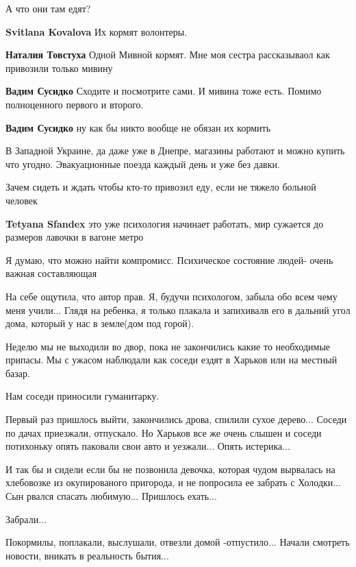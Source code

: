 \begin{itemize}
А что они там едят?

\begin{itemize} %
\textbf{Svitlana Kovalova} Их кормят волонтеры.

\textbf{Наталия Товстуха} Одной Мивной кормят. Мне моя сестра рассказываол как привозили только мивину

\textbf{Вадим Сусидко} Сходите и посмотрите сами. И мивина тоже есть. Помимо полноценного первого и второго.

\textbf{Вадим Сусидко} ну как бы никто вообще не обязан их кормить

В Западной Украине, да даже уже в Днепре, магазины работают и можно купить что
угодно. Эвакуационные поезда каждый день и уже без давки.

Зачем сидеть и ждать чтобы кто-то привозил еду, если не тяжело больной человек

\textbf{Tetyana Sfandex} это уже психология начинает работать, мир сужается до размеров лавочки в вагоне метро
\end{itemize} %

Я думаю, что можно найти компромисс. Психическое состояние людей- очень важная составляющая


На себе ощутила, что автор прав. Я, будучи психологом, забыла обо всем чему
меня учили... Глядя на ребенка, я только плакала и запихивалв его в дальний
угол дома, который у нас в земле(дом под горой).

Неделю мы не выходили во двор, пока не закончились какие то необходимые
припасы.  Мы с ужасом наблюдали как соседи ездят в Харьков или на местный
базар.

Нам соседи приносили гуманитарку.

Первый раз пришлось выйти, закончились дрова, спилили сухое дерево... Соседи по
дачах приезжали, отпускало. Но Харьков все же очень слышен и соседи потихоньку
опять паковали свои авто и уезжали... Опять истерика...

И так бы и сидели если бы не позвонила девочка, которая чудом вырвалась на
хлебовозке из окупированого пригорода, и не попросила ее забрать с Холодки...
Сын рвался спасать любимую... Пришлось ехать...

Забрали...

Покормилы, поплакали, выслушали, отвезли домой -отпустило... Начали смотреть
новости, вникать в реальность бытия...


\end{itemize}
